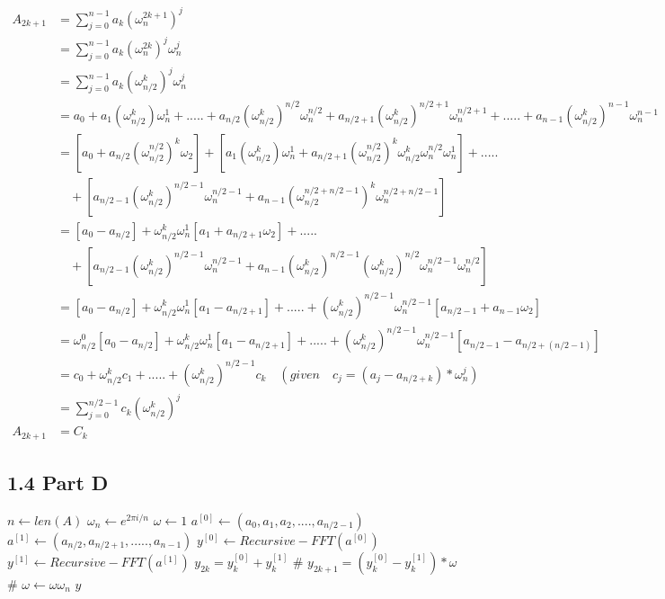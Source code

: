 \documentclass[12pt]{article}
\begin{document}
\begin{equation}
\begin{aligned}
\nonumber
A_{2k+1}&=\sum_{j=0}^{n-1} a_k(\omega_n^{2k+1})^j \\
&=\sum_{j=0}^{n-1} a_k(\omega_n^{2k})^j\omega_n^j \\
&=\sum_{j=0}^{n-1} a_k(\omega_{n/2}^{k})^j\omega_n^j \\
&=a_0+a_1(\omega_{n/2}^{k})\omega_n^1+.....+a_{n/2}(\omega_{n/2}^{k})^{n/2}\omega_n^{n/2}+a_{n/2+1}(\omega_{n/2}^{k})^{n/2+1}\omega_n^{n/2+1}+.....+a_{n-1}(\omega_{n/2}^{k})^{n-1}\omega_n^{n-1} \\
&=[a_0+a_{n/2}(\omega_{n/2}^{n/2})^{k}\omega_2]+[a_1(\omega_{n/2}^{k})\omega_n^1+a_{n/2+1}(\omega_{n/2}^{n/2})^{k}\omega_{n/2}^{k}\omega_n^{n/2}\omega_n^{1}]+..... \\ &\quad + [a_{n/2-1}(\omega_{n/2}^{k})^{n/2-1}\omega_n^{n/2-1}+a_{n-1}(\omega_{n/2}^{n/2+n/2-1})^k\omega_n^{n/2+n/2-1}] \\
&=[a_0-a_{n/2}]+\omega_{n/2}^{k}\omega_n^1[a_1+a_{n/2+1}\omega_2]+..... \\ &\quad + [a_{n/2-1}(\omega_{n/2}^{k})^{n/2-1}\omega_n^{n/2-1}+a_{n-1}(\omega_{n/2}^{k})^{n/2-1}(\omega_{n/2}^{k})^{n/2}\omega_n^{n/2-1}\omega_n^{n/2}] \\
&=[a_0-a_{n/2}]+\omega_{n/2}^{k}\omega_n^1[a_1-a_{n/2+1}]+..... + (\omega_{n/2}^{k})^{n/2-1}\omega_n^{n/2-1}[a_{n/2-1}+a_{n-1}\omega_2] \\
&=\omega_{n/2}^0[a_0-a_{n/2}]+\omega_{n/2}^{k}\omega_n^1[a_1-a_{n/2+1}]+..... + (\omega_{n/2}^{k})^{n/2-1}\omega_n^{n/2-1}[a_{n/2-1}-a_{n/2+(n/2-1)}] \\
&=c_0+\omega_{n/2}^{k}c_1+.....+(\omega_{n/2}^{k})^{n/2-1}c_k \quad (given \quad c_j=(a_j-a_{n/2+k})*
\omega_n^j) \\ 
&=\sum_{j=0}^{n/2-1} c_k(\omega_{n/2}^{k})^j \\
A_{2k+1}&=C_k
\end{aligned}
\end{equation}

\subsection*{1.4 Part D}
\vspace{10pt}

\begin{algorithmic}
\State $n \gets len(A)$ \quad {}
\EndIf
\State $\omega_n \gets e^{2\pi i/n}$
\State $\omega \gets 1$
\State $a^{[0]} \gets (a_0, a_1, a_2, ...., a_{n/2-1})$
\State $a^{[1]} \gets (a_{n/2},a_{n/2+1}, ....., a_{n-1})$
\State $y^{[0]} \gets Recursive-FFT(a^{[0]})$
\State $y^{[1]} \gets Recursive-FFT(a^{[1]})$
\State $y_{2k}=y_k^{[0]}+ y_k^{[1]}$ \quad \#
\State $y_{2k+1}=(y_k^{[0]}- y_k^{[1]})*\omega$ \quad \#
\State $\omega \gets \omega\omega_n$
\EndFor
\Return $y$
\EndProcedure
\end{algorithmic}
\end{document}
